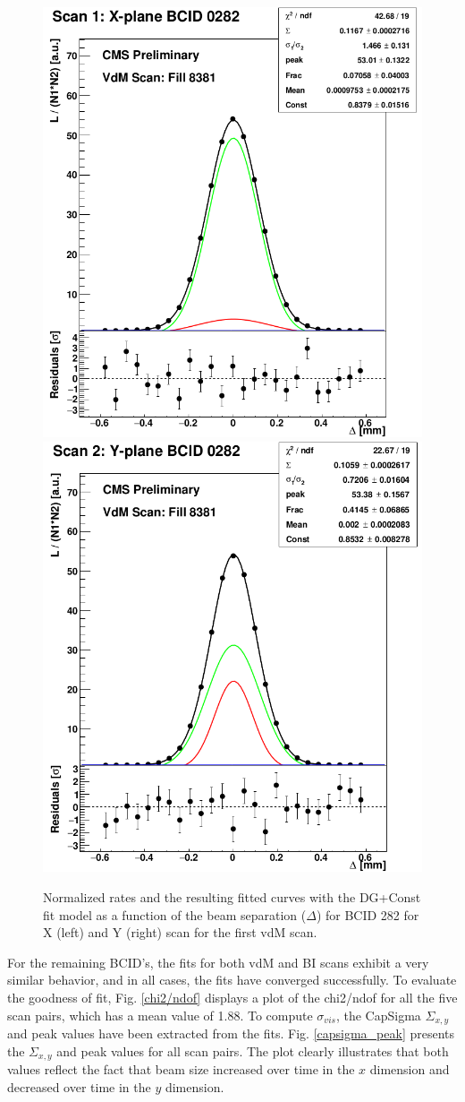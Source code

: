 \begin{center}
\begin{figure}[h!]
\centering
\includegraphics[width=.37\textwidth]{Chapter4/xscan.png}
\includegraphics[width=.37\textwidth]{Chapter4/yscan.png}\\
\caption[vdM1 BCID 282]{Normalized rates and the resulting fitted curves with the DG+Const fit model as a function of the beam separation ($\Delta$) for BCID 282 for X (left) and Y (right) scan for the first vdM scan.}
\label{vdM1_282_XYscan}
\end{figure}
\end{center}

\newpage
For the remaining BCID's, the fits for both vdM and BI scans exhibit a very similar behavior, and in all cases, the fits have converged successfully. To evaluate the goodness of fit, Fig. \ref{chi2/ndof} displays a plot of the chi2/ndof for all the five scan pairs, which has a mean value of 1.88.
To compute $\sigma_{vis}$, the CapSigma $\Sigma_{x,y}$ and peak values have been extracted from the fits. Fig. \ref{capsigma_peak} presents the $\Sigma_{x,y}$ and peak values for all scan pairs. The plot clearly illustrates that both values reflect the fact that beam size increased over time in the $x$ dimension and decreased over time in the $y$ dimension.

